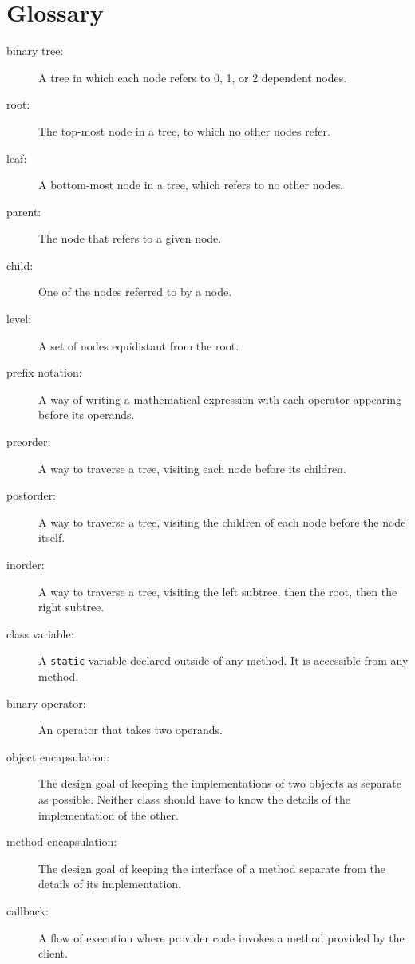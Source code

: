 \documentclass[12pt]{book}
\theoremstyle{exercise}
\begin{document}
\section{Glossary}

\begin{description}

\item[binary tree:]  A tree in which each node refers to 0, 1, or
2 dependent nodes.

\item[root:]  The top-most node in a tree, to which no other nodes
refer.

\item[leaf:]  A bottom-most node in a tree, which refers to no other
nodes.

\item[parent:]  The node that refers to a given node.

\item[child:]  One of the nodes referred to by a node.

\item[level:]  A set of nodes equidistant from the root.

\item[prefix notation:]  A way of writing a mathematical expression
with each operator appearing before its operands.

\item[preorder:]  A way to traverse a tree, visiting each node
before its children.

\item[postorder:]  A way to traverse a tree, visiting the children
of each node before the node itself.

\item[inorder:]  A way to traverse a tree, visiting the left subtree,
then the root, then the right subtree.

\item[class variable:]  A {\tt static} variable declared outside of any
method.  It is accessible from any method.

\item[binary operator:]  An operator that takes two operands.

\item[object encapsulation:]  The design goal of keeping
the implementations of two objects as separate as possible.  Neither
class should have to know the details of the implementation of
the other.

\item[method encapsulation:]  The design goal of keeping the
interface of a method separate from the details of its implementation.

\item[callback:] A flow of execution where provider code invokes
a method provided by the client.

\end{description}
\end{document}
